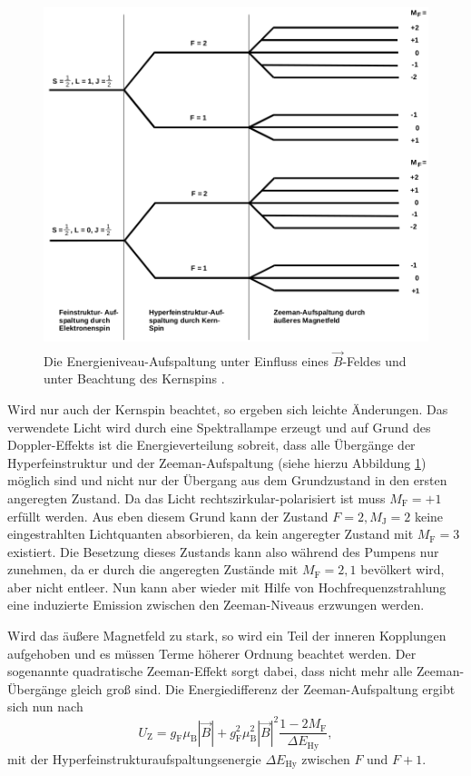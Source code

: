 \begin{figure}
  \centering
  \includegraphics[height=10cm]{content/pictures/Energieniveaus2.png}
  \caption{Die Energieniveau-Aufspaltung unter Einfluss eines $\vec{B}$-Feldes und unter Beachtung des Kernspins \cite{anleitung}.}
  \label{fig:aufspaltung2}
\end{figure}
Wird nur auch der Kernspin beachtet, so ergeben sich leichte Änderungen. Das verwendete Licht wird durch eine Spektrallampe erzeugt und 
auf Grund des Doppler-Effekts ist die Energieverteilung sobreit, dass alle Übergänge der 
Hyperfeinstruktur und der Zeeman-Aufspaltung (siehe hierzu Abbildung \ref{fig:aufspaltung2}) möglich sind und nicht nur der Übergang aus
dem Grundzustand in den ersten angeregten Zustand. Da das Licht rechtszirkular-polarisiert ist
muss $M_\text{F} = +1$ erfüllt werden. Aus eben diesem Grund kann der Zustand $F = 2, M_\text{J} = 2$ keine
eingestrahlten Lichtquanten absorbieren, da kein angeregter Zustand mit $M_\text{F} = 3$ existiert. Die Besetzung dieses Zustands
kann also während des Pumpens nur zunehmen, da er durch die angeregten Zustände mit $M_\text{F} = 2, 1$ bevölkert wird, aber nicht entleer.
Nun kann aber wieder mit Hilfe von Hochfrequenzstrahlung eine induzierte Emission zwischen den Zeeman-Niveaus erzwungen werden.

Wird das äußere Magnetfeld zu stark, so wird ein Teil der inneren Kopplungen aufgehoben und 
es müssen Terme höherer Ordnung beachtet werden. Der sogenannte quadratische Zeeman-Effekt sorgt dabei, dass nicht mehr alle 
Zeeman-Übergänge gleich groß sind. Die Energiedifferenz der Zeeman-Aufspaltung ergibt sich nun nach
\begin{equation}
  \label{eqn:zeemanquadrat}
  U_\text{Z} = g_\text{F} \mu_\text{B} |\vec{B}| + g_\text{F}^2 \mu_\text{B}^2 |\vec{B}|^2 \frac{1-2 M_\text{F}}{\Delta E_\text{Hy}},
\end{equation}
mit der Hyperfeinstrukturaufspaltungsenergie $\Delta E_\text{Hy}$ zwischen $F$ und $F+1$.

